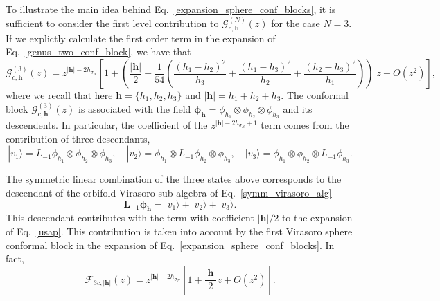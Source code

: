 \documentclass[a4paper,11pt]{article}
\begin{document}
To illustrate the main idea behind Eq.~\eqref{expansion_sphere_conf_blocks}, it is sufficient to consider the first level contribution to  
$\mathcal{G}_{c, \boldsymbol{h}}^{(N)}(z)$ for the case $N=3$. If we explictly calculate the first order term in the expansion of Eq.~\eqref{genus_two_conf_block}, we have that
\begin{equation}
\mathcal{G}_{c, \boldsymbol{h}}^{(3)}(z)= z^{|\boldsymbol{h}|-2h_{\sigma_N}}\left[1+\left(\frac{|\boldsymbol{h}|}{2}+\frac{1}{54}\left(\frac{(h_1-h_2)^2}{h_3}+\frac{(h_1-h_3)^2}{h_2}+\frac{(h_2-h_3)^2}{h_1}\right)\right)\;z+O(z^2)\right],
\end{equation}
where we recall that here $\boldsymbol{h}=\{h_1,h_2,h_3\}$ and $|\boldsymbol{h}|=h_1+h_2+h_3$. The conformal block $\mathcal{G}_{c, \boldsymbol{h}}^{(3)}(z)$ is associated with the field $\boldsymbol{\phi}_{\boldsymbol{h}}=\phi_{h_1}\otimes\phi_{h_2}\otimes\phi_{h_3}$ and its descendents. In particular, the coefficient of the $z^{|\boldsymbol{h}|-2h_{\sigma_N}+1}$ term comes from the contribution of three descendants,
\begin{equation}
|v_1\rangle =L_{-1}\phi_{h_1}\otimes \phi_{h_2}\otimes \phi_{h_3},   \quad |v_2\rangle =\phi_{h_1}\otimes  L_{-1}\phi_{h_2}\otimes \phi_{h_3},\quad |v_3\rangle=\phi_{h_1}\otimes \phi_{h_2}\otimes  L_{-1} \phi_{h_3}.
\end{equation}

The symmetric linear combination of the three states above corresponds to the descendant of the orbifold Virasoro sub-algebra
of Eq.~\eqref{symm_virasoro_alg}
\begin{equation}
\boldsymbol{L}_{-1}\boldsymbol{\phi}_{\boldsymbol{h}}=|v_1\rangle+|v_2\rangle+|v_3\rangle.
\end{equation} 
This descendant contributes with the term with coefficient $|\boldsymbol{h}|/2$ to the expansion of Eq.~\eqref{usap}. This contribution is taken into account by the first Virasoro sphere conformal block in the expansion of Eq.~\eqref{expansion_sphere_conf_blocks}. In fact, 
\begin{equation}
\mathcal{F}_{3c, |\boldsymbol{h}|}(z)=z^{|\boldsymbol{h}|-2h_{\sigma_N}}\left[1+\frac{|\boldsymbol{h}|}{2}z+O(z^2)\right].
\end{equation}
\end{document}
